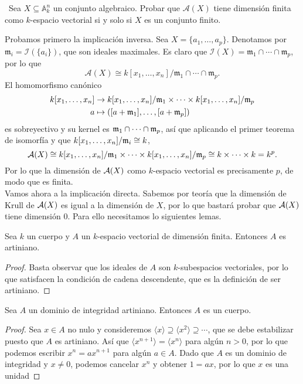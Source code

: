 \documentclass[twoside]{article}
\begin{document}
\newpage

\begin{ejercicio}{3}\
Sea $X \subseteq \mathbb{A}^n_k$
un conjunto algebraico. Probar que $\mathcal{A}(X)$ tiene
dimensión finita como $k$-espacio vectorial si y solo si $X$ es un conjunto finito.
\end{ejercicio}
\begin{solucion}
Probamos primero la implicación inversa. Sea $X=\{a_1,\dots,a_p\}$. Denotamos por $\mathfrak{m}_i=\mathcal{I}(\{a_i\})$, que son ideales maximales. Es claro que $\mathcal{I}(X)=\mathfrak{m}_1\cap\cdots\cap\mathfrak{m}_p$, por lo que $$\mathcal{A}(X) \cong k[x_1,\dots,x_n]/\mathfrak{m}_1\cap\cdots\cap\mathfrak{m}_p.$$ El homomorfismo canónico
\begin{align*}
k[x_1,\dots,x_n]&\to k[x_1,\dots,x_n]/\mathfrak{m}_1\times\cdots\times k[x_1,\dots,x_n]/\mathfrak{m}_p\\
a&\mapsto ([a+\mathfrak{m}_1],\dots,[a+\mathfrak{m}_p])
\end{align*}
es sobreyectivo y su kernel es $\mathfrak{m}_1\cap\cdots\cap\mathfrak{m}_p$, así que aplicando el primer teorema de isomorfía y que  $k[x_1,\dots,x_n]/\mathfrak{m}_i\cong k$, 
$$
\mathcal{A}(X)\cong k[x_1,\dots,x_n]/\mathfrak{m}_1\times\cdots\times k[x_1,\dots,x_n]/\mathfrak{m}_p\cong k\times\cdots\times k=k^p.
$$
Por lo que la dimensión de $\mathcal{A}(X)$ como $k$-espacio vectorial es precisamente $p$, de modo que es finita.\\

Vamos ahora a la implicación directa. Sabemos por teoría que la dimensión de Krull de $\mathcal{A}(X)$ es igual a la dimensión de $X$, por lo que bastará probar que $\mathcal{A}(X)$ tiene dimensión 0. Para ello necesitamos lo siguientes lemas.

\newpage

\begin{lemma}\label{lema}
Sea $k$ un cuerpo y $A$ un $k$-espacio vectorial de dimensión finita. Entonces $A$ es artiniano.
\end{lemma}
\begin{proof}
Basta observar que los ideales de $A$ son $k$-subespacios vectoriales, por lo que satisfacen la condición de cadena descendente, que es la definición de ser artiniano.
\end{proof}



\begin{lemma}
Sea $A$ un dominio de integridad artiniano. Entonces $A$ es un cuerpo. 
\end{lemma}
\begin{proof}
Sea $x\in A$ no nulo y consideremos $\langle x\rangle\supseteq\langle x^2\rangle\supseteq\cdots$, que se debe estabilizar puesto que $A$ es artiniano. Así que $\langle x^{n+1}\rangle=\langle x^n\rangle$ para algún $n>0$, por lo que podemos escribir $x^n=ax^{n+1}$ para algún $a\in A$. Dado que $A$ es un dominio de integridad y $x\neq 0$, podemos cancelar $x^n$ y obtener $1=ax$, por lo que $x$ es una unidad
\end{proof}


\end{solucion}
\end{document}
